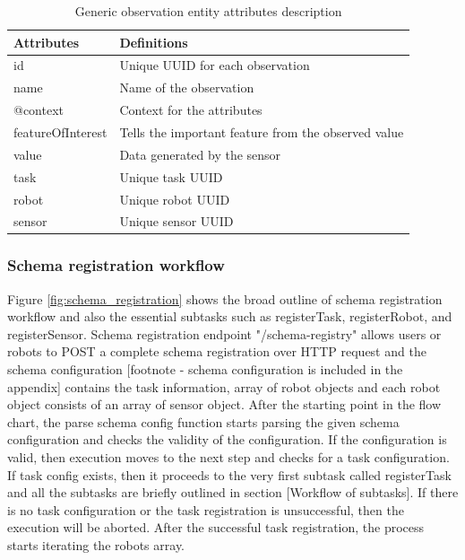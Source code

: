 	\begin{table}[!htbp]
		\begin{tabular}{|l|p{12cm}|}
			\hline
			\textbf{Attributes} & \textbf{Definitions} \\ \hline
			
				id & Unique UUID for each observation \\ \hline
				name & Name of the observation \\ \hline
				@context & Context for the attributes \\ \hline
				featureOfInterest & Tells the important feature from the observed value \\ \hline
				value & Data generated by the sensor \\ \hline
				task & Unique task UUID \\ \hline
				robot & Unique robot UUID \\ \hline
				sensor & Unique sensor UUID \\ \hline

			
		\end{tabular}
		\caption{Generic observation entity attributes description}
		\label{tab:observation}
	\end{table}

	\subsubsection{Schema registration workflow}
	Figure \ref{fig:schema_registration} shows the broad outline of schema registration workflow and also the essential subtasks such as registerTask,  registerRobot, and registerSensor. Schema registration endpoint "/schema-registry" allows users or robots to POST a complete schema registration over HTTP request and the schema configuration [footnote - schema configuration is included in the appendix] contains the task information, array of robot objects and each robot object consists of an array of sensor object. After the starting point in the flow chart, the parse schema config function starts parsing the given schema configuration and checks the validity of the configuration. If the configuration is valid, then execution moves to the next step and checks for a task configuration. If task config exists, then it proceeds to the very first subtask called registerTask and all the subtasks are briefly outlined in section [Workflow of subtasks]. If there is no task configuration or the task registration is unsuccessful, then the execution will be aborted.  After the successful task registration, the process starts iterating the robots array. 
	

